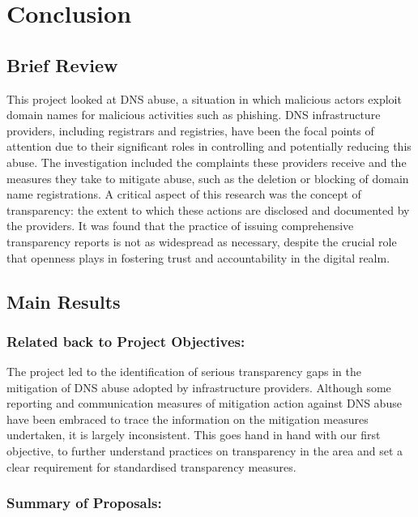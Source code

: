 \chapter{Conclusion}

\section{Brief Review}

This project looked at DNS abuse, a situation in which malicious actors exploit domain names for malicious activities such as phishing. DNS infrastructure providers, including registrars and registries, have been the focal points of attention due to their significant roles in controlling and potentially reducing this abuse. The investigation included the complaints these providers receive and the measures they take to mitigate abuse, such as the deletion or blocking of domain name registrations. A critical aspect of this research was the concept of transparency: the extent to which these actions are disclosed and documented by the providers. It was found that the practice of issuing comprehensive transparency reports is not as widespread as necessary, despite the crucial role that openness plays in fostering trust and accountability in the digital realm. 


\section{Main Results}

\subsection{Related back to Project Objectives:}

The project led to the identification of serious transparency gaps in the mitigation of DNS abuse adopted by infrastructure providers. Although some reporting and communication measures of mitigation action against DNS abuse have been embraced to trace the information on the mitigation measures undertaken, it is largely inconsistent. This goes hand in hand with our first objective, to further understand practices on transparency in the area and set a clear requirement for standardised transparency measures.

\subsection{Summary of Proposals:}

